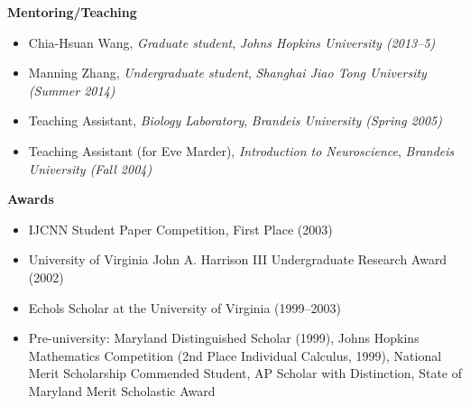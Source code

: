 \documentclass[10pt]{article}
\begin{document}
{\large \textbf{Mentoring/Teaching}}
\begin{itemize}
  \item Chia-Hsuan Wang, \emph{Graduate student}, \emph{Johns Hopkins University (2013--5)}
  \item Manning Zhang, \emph{Undergraduate student}, \emph{Shanghai Jiao Tong University (Summer 2014)}
  \item Teaching Assistant, \emph{Biology Laboratory}, \emph{Brandeis University (Spring 2005)}
  \item Teaching Assistant (for Eve Marder), \emph{Introduction to Neuroscience}, \emph{Brandeis University (Fall 2004)}
\end{itemize}


{\large \textbf{Awards}}
\begin{itemize}
  \item IJCNN Student Paper Competition, First Place (2003)
  \item University of Virginia John A. Harrison III Undergraduate Research Award (2002)
  \item Echols Scholar at the University of Virginia (1999--2003) 
  \item Pre-university: Maryland Distinguished Scholar (1999), Johns Hopkins Mathematics Competition (2nd Place Individual Calculus, 1999), National Merit Scholarship Commended Student, AP Scholar with Distinction, State of Maryland Merit Scholastic Award
\end{itemize}
\end{document}
